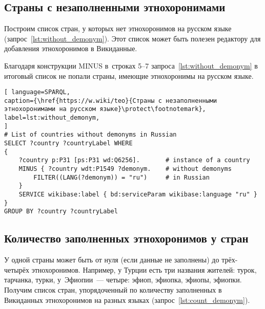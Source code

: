 \subsection{Страны с незаполненными этнохоронимами}

Построим список стран, у которых нет этнохоронимов на русском языке (запрос~\ref{lst:without_demonym}). 
Этот список может быть полезен редактору для добавления этнохоронимов в Викиданные. 

Благодаря конструкции MINUS в~строках 5--7 запроса~\ref{lst:without_demonym} 
в итоговый список не попали страны, имеющие этнохоронимы на русском языке.

\newpage
{}
\begin{lstlisting}[ language=SPARQL, 
caption={\href{https://w.wiki/teo}{Страны с незаполненными этнохоронимами на русском языке}\protect\footnotemark},
label=lst:without_demonym, 
]
# List of countries without demonyms in Russian
SELECT ?country ?countryLabel WHERE
{
	?country p:P31 [ps:P31 wd:Q6256].       # instance of a country
	MINUS { ?country wdt:P1549 ?demonym.    # without demonyms
        FILTER((LANG(?demonym)) = "ru")     # in Russian
	}
	SERVICE wikibase:label { bd:serviceParam wikibase:language "ru" }
}
GROUP BY ?country ?countryLabel
\end{lstlisting}






\subsection{Количество заполненных этнохоронимов у стран}

У одной страны может быть от нуля (если данные не заполнены) до трёх-четырёх этнохоронимов. 
Например, у Турции есть три названия жителей: турок, тарчанка, турки, 
у~Эфиопии~--- четыре: эфиоп, эфиопка, эфиопы, эфиопки.
Получим список стран, упорядоченный по количеству заполненных в Викиданных этнохоронимов 
на разных языках (запрос~\ref{lst:count_demonym}). 

